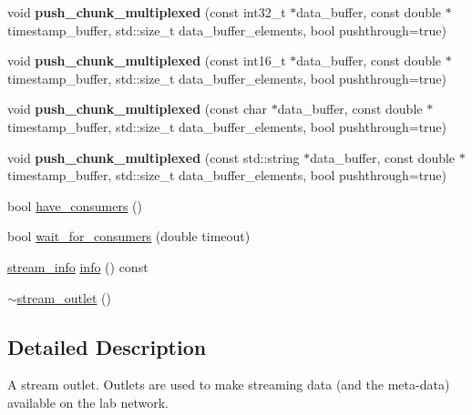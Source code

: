 \begin{DoxyCompactItemize}
\mbox{\label{classlsl_1_1stream__outlet_a10acfcf6b1db179f04596def60bc3792}} 
void {\bfseries push\+\_\+chunk\+\_\+multiplexed} (const int32\+\_\+t $\ast$data\+\_\+buffer, const double $\ast$timestamp\+\_\+buffer, std\+::size\+\_\+t data\+\_\+buffer\+\_\+elements, bool pushthrough=true)
\item 
\mbox{\label{classlsl_1_1stream__outlet_ac90405c89feb8c95a493f42a0c749421}} 
void {\bfseries push\+\_\+chunk\+\_\+multiplexed} (const int16\+\_\+t $\ast$data\+\_\+buffer, const double $\ast$timestamp\+\_\+buffer, std\+::size\+\_\+t data\+\_\+buffer\+\_\+elements, bool pushthrough=true)
\item 
\mbox{\label{classlsl_1_1stream__outlet_a6ff877ac1b4c96f38ac36a2319a874da}} 
void {\bfseries push\+\_\+chunk\+\_\+multiplexed} (const char $\ast$data\+\_\+buffer, const double $\ast$timestamp\+\_\+buffer, std\+::size\+\_\+t data\+\_\+buffer\+\_\+elements, bool pushthrough=true)
\item 
\mbox{\label{classlsl_1_1stream__outlet_a17744ee6e963464fe6442d1e6f1a50f8}} 
void {\bfseries push\+\_\+chunk\+\_\+multiplexed} (const std\+::string $\ast$data\+\_\+buffer, const double $\ast$timestamp\+\_\+buffer, std\+::size\+\_\+t data\+\_\+buffer\+\_\+elements, bool pushthrough=true)
\item 
bool \hyperlink{classlsl_1_1stream__outlet_a3e7fad1010ef7c78bcd006a4f94381fa}{have\+\_\+consumers} ()
\item 
bool \hyperlink{classlsl_1_1stream__outlet_af188fa767e2a70c402486b761e9869fe}{wait\+\_\+for\+\_\+consumers} (double timeout)
\item 
\hyperlink{classlsl_1_1stream__info}{stream\+\_\+info} \hyperlink{classlsl_1_1stream__outlet_af6fda8eb922b27ae3ed98651934243fe}{info} () const
\item 
\hyperlink{classlsl_1_1stream__outlet_aa8a10c88f57686d77bee002aff4c9d4e}{$\sim$stream\+\_\+outlet} ()
\end{DoxyCompactItemize}


\subsection{Detailed Description}
A stream outlet. Outlets are used to make streaming data (and the meta-\/data) available on the lab network. 

